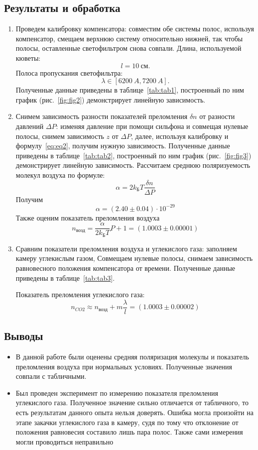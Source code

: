 \documentclass[12pt]{article}
\begin{document}
    \subsection*{Результаты и обработка}
    \begin{enumerate}
        \item Проведем калибровку компенсатора: совместим обе системы полос, используя компенсатор,
        смещаем верхнюю систему относительно нижней, так чтобы полосы,
        оставленные светофильтром снова совпали.
        Длина, используемой кюветы:
        \[l = 10\ \text{см}.\]
        Полоса пропускания светофильтра:
        \[\lambda \in [6200\ A, 7200\ A].\]
        Полученные данные приведены в таблице\ \ref{tab:tab1}, построенный по ним график (рис.\ \ref{fig:fig2})
        демонстрирует линейную зависимость.

        \item Снимем зависимость разности показателей преломления $\delta n$ от разности давлений $\Delta P$:
        изменяя давление при помощи сильфона и совмещая нулевые полосы, снимем зависимость $z$ от $\Delta P$,
        далее, используя калибровку и формулу\ \eqref{eq:eq2}, получим нужную зависимость.
        Полученные данные приведены в таблице\ \ref{tab:tab2}, построенный по ним график (рис.\ \ref{fig:fig3})
        демонстрирует линейную зависимость.
        Рассчитаем среднюю поляризуемость молекул воздуха по формуле:
        \[\alpha = 2 k_{\text{Б}} T \frac{\delta n}{\Delta P}\]
        Получим
        \[\alpha = (2.40 \pm 0.04) \cdot 10^{-29}\]
        Также оценим показатель преломления воздуха
        \[n_{\text{возд}} = \frac{\alpha}{2 k_{\text{Б}} T} P + 1 = (1.0003 \pm 0.00001)\]

        \item Сравним показатели преломления воздуха и углекислого газа: заполняем камеру углекислым газом,
        Совмещаем нулевые полосы, снимаем зависимость равновесного положения компенсатора от времени.
        Полученные данные приведены в таблице\ \ref{tab:tab3}.

        Показатель преломления углекислого газа:
        \[n_{CO2} \approx n_{\text{возд}} + m\frac{\lambda}{l} = (1.0003 \pm 0.00002)\]
    \end{enumerate}

    \subsection*{Выводы}
    \begin{itemize}
        \item В данной работе были оценены средняя поляризация молекулы и показатель преломления воздуха
        при нормальных условиях.
        Полученные значения совпали с табличными.
        \item Был проведен эксперимент по измерению показателя преломления углекислого газа.
        Полученное значение сильно отличается от табличного, то есть результатам данного опыта нельзя доверять.
        Ошибка могла произойти на этапе закачки углекислого газа в камеру, судя по тому
        что отклонение от положения равновесия составило лишь пара полос.
        Также сами измерения могли проводиться неправильно
    \end{itemize}
\end{document}
